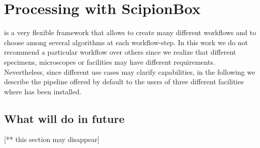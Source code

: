 \section{Processing with ScipionBox}


\scipion is a very flexible framework that allows to create many different workflows and to choose among several algorithms at each workflow-step. In this work we do not recommend a particular workflow 
over others since we realize that different specimens, microscopes or facilities may have different requirements. Nevertheless, since different use cases may clarify \scipionbox capabilities, in the following we describe the pipeline offered by default to the users of three different facilities where \scipion has been installed.








\subsection{What will do in future}
[** this section may disappear] 


